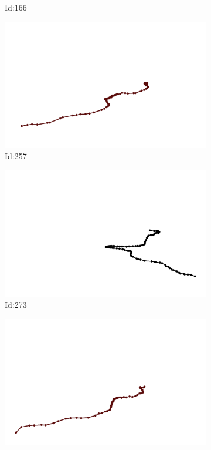 \documentclass[12pt,twoside]{report}
\begin{document}
\begin{figure}
\begin{subfigure}[b]{0.20\textwidth}
\caption{Id:166}
\end{subfigure}
\begin{subfigure}[b]{0.20\textwidth}
\centering
\includegraphics[width=\textwidth]{../trajectories/257.png}
\caption{Id:257}
\end{subfigure}
\begin{subfigure}[b]{0.20\textwidth}
\centering
\includegraphics[width=\textwidth]{../trajectories/273.png}
\caption{Id:273}
\end{subfigure}
\begin{subfigure}[b]{0.20\textwidth}
\centering
\includegraphics[width=\textwidth]{../trajectories/285.png}

\end{subfigure}
\end{figure}
\end{document}
